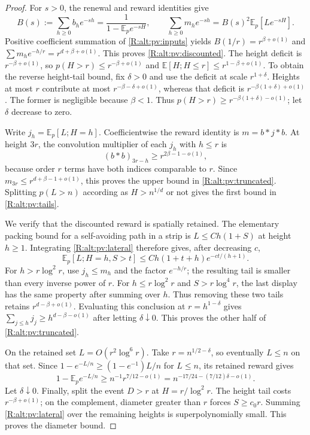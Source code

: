 \begin{proof}
For $s>0$, the renewal and reward identities give
\[
 B(s):=\sum_{h\ge0}b_he^{-sh}=\frac1{1-\mathbb E_p e^{-sH}},\qquad
 \sum_{h\ge0}m_he^{-sh}=B(s)^2\mathbb E_p[Le^{-sH}].
\]
Positive coefficient summation of \eqref{R:alt:pv:inputs} yields
$B(1/r)=r^{\beta+o(1)}$ and
$\sum m_he^{-h/r}=r^{d+\beta+o(1)}$.  This proves
\eqref{R:alt:pv:discounted}.  The height deficit is
$r^{-\beta+o(1)}$, so $p(H>r)\le r^{-\beta+o(1)}$ and
$\mathbb E[H;H\le r]\le r^{1-\beta+o(1)}$.
To obtain the reverse height-tail bound, fix $\delta>0$ and use the deficit
at scale $r^{1+\delta}$.  Heights at most $r$ contribute at most
$r^{-\beta-\delta+o(1)}$, whereas that deficit is
$r^{-\beta(1+\delta)+o(1)}$.  The former is negligible because $\beta<1$.
Thus $p(H>r)\ge r^{-\beta(1+\delta)-o(1)}$; let $\delta$ decrease to zero.

Write $j_h=\mathbb E_p[L;H=h]$.  Coefficientwise the reward identity is
$m=b*j*b$.  At height $3r$, the convolution multiplier of each $j_h$ with
$h\le r$ is
\[
 (b*b)_{3r-h}\ge r^{2\beta-1-o(1)},
\]
because order $r$ terms have both indices comparable to $r$.
Since $m_{3r}\le r^{d+\beta-1+o(1)}$, this proves the upper bound in
\eqref{R:alt:pv:truncated}.  Splitting $p(L>n)$ according as
$H>n^{1/d}$ or not gives the first bound in \eqref{R:alt:pv:tails}.

We verify that the discounted reward is spatially retained.  The elementary
packing bound for a self-avoiding path in a strip is
$L\le C h(1+S)$ at height $h\ge1$.
Integrating \eqref{R:alt:pv:lateral} therefore gives, after decreasing $c$,
\[
 \mathbb E_p[L;H=h,S>t]
 \le C h(1+t+h)e^{-ct/(h+1)}.
\]
For $h>r\log^2r$, use $j_h\le m_h$ and the factor $e^{-h/r}$;
the resulting tail is smaller than every inverse power of $r$.
For $h\le r\log^2r$ and $S>r\log^4r$, the last display has the same
property after summing over $h$.  Thus removing these two tails retains
$r^{d-\beta+o(1)}$.  Evaluating this conclusion at $r=h^{1-\delta}$
gives $\sum_{j\le h}j_j\ge h^{d-\beta-o(1)}$ after letting
$\delta\downarrow0$.  This proves the other half of
\eqref{R:alt:pv:truncated}.

On the retained set $L=O(r^2\log^6r)$.  Take
$r=n^{1/2-\delta}$, so eventually $L\le n$ on that set.  Since
$1-e^{-L/n}\ge(1-e^{-1})L/n$ for $L\le n$, its retained reward gives
\[
 1-\mathbb E_p e^{-L/n}
 \ge n^{-1}r^{7/12-o(1)}
 =n^{-17/24-(7/12)\delta-o(1)}.
\]
Let $\delta\downarrow0$.  Finally, split the event $D>r$ at
$H=r/\log^2r$.  The height tail costs $r^{-\beta+o(1)}$; on the
complement, diameter greater than $r$ forces $S\ge c_0r$.
Summing \eqref{R:alt:pv:lateral} over the remaining heights is
superpolynomially small.  This proves the diameter bound.
\end{proof}

